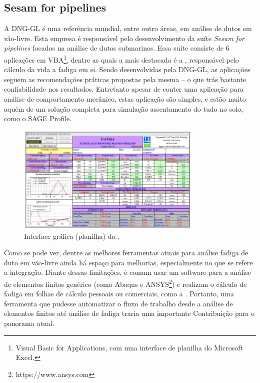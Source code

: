 \subsection{Sesam for pipelines}

A DNG-GL é uma referência mundial, entre outro áreas, em análise de dutos em vão-livre. Esta empresa é responsável pelo desenvolvimento da suíte \textit{Sesam for pipelines} \cite{Sesam} focados na análise de dutos submarinos.
Essa suíte consiste de 6 aplicações em VBA\footnote{Visual Basic for Applications, com uma interface de planilha do Microsoft Excel.}, dentre as quais a mais destacada é a \fatfree, responsável pelo cálculo da vida a fadiga em si. Sendo desenvolvidas pela DNG-GL, as aplicações seguem as recomendações práticas propostas pela mesma -- o que trás bastante confiabilidade nos resultados. Entretanto apesar de conter uma aplicação para análise de comportamento mecânico, estas aplicação são simples, e estão muito aquém de um solução completa para simulação assentamento do tudo no solo, como o SAGE Profile.

\begin{figure}[!ht]
    \centering
    \caption{Interface gráfica (planilha) da \fatfree.}\label{fig:fatfree}
    \includegraphics[width=0.8\textwidth]{imagens/fatfree}
\end{figure}

Como se pode ver, dentre as melhores ferramentas atuais para análise fadiga de duto em vão-livre ainda há espaço para melhorias, especialmente no que se refere a integração. Diante dessas limitações, é comum usar um software para a análise de elementos finitos genérico (como Abaqus e ANSYS\footnote{https://www.ansys.com}) e realizam o cálculo de fadiga em folhas de cálculo pessoais ou comerciais, como a \fatfree. Portanto, uma ferramenta que pudesse automatizar o fluxo de trabalho desde a análise de elementos finitos até análise de fadiga traria uma importante Contribuição para o panorama atual.


